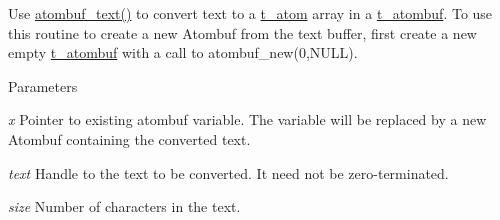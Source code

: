 Use \hyperlink{group__atombuf_gada864b7fc2e47dbdbef3176de00924a2}{atombuf\_\-text()} to convert text to a \hyperlink{structt__atom}{t\_\-atom} array in a \hyperlink{structt__atombuf}{t\_\-atombuf}. To use this routine to create a new Atombuf from the text buffer, first create a new empty \hyperlink{structt__atombuf}{t\_\-atombuf} with a call to atombuf\_\-new(0,NULL).


\begin{DoxyParams}{Parameters}
\item[{\em x}]Pointer to existing atombuf variable. The variable will be replaced by a new Atombuf containing the converted text. \item[{\em text}]Handle to the text to be converted. It need not be zero-\/terminated. \item[{\em size}]Number of characters in the text. \end{DoxyParams}
